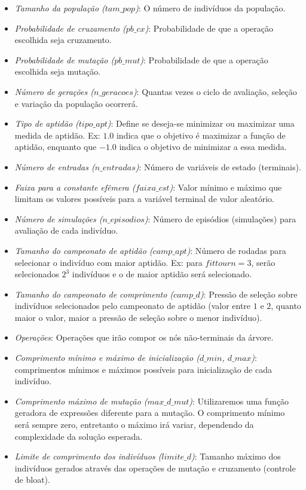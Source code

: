 \begin{itemize}[label=\raisebox{0.25ex}{\tiny$\bullet$}]
	\item \textit{Tamanho da população ($tam\_pop$)}: O número de indivíduos da população. 
	\item \textit{Probabilidade de cruzamento ($pb\_cx$)}: Probabilidade de que a operação escolhida seja cruzamento.
	\item \textit{Probabilidade de mutação ($pb\_mut$)}: Probabilidade de que a operação escolhida seja mutação.
	\item \textit{Número de gerações ($n\_geracoes$)}: Quantas vezes o ciclo de avaliação, seleção e variação da população ocorrerá.
	\item \textit{Tipo de aptidão ($tipo\_apt$)}: Define se deseja-se minimizar ou maximizar uma medida de aptidão. Ex: $1.0$ indica que o objetivo é maximizar a função de aptidão, enquanto que $-1.0$ indica o objetivo de minimizar a essa medida.
	\item \textit{Número de entradas ($n\_entradas$)}: Número de variáveis de estado (terminais).
	\item \textit{Faixa para a constante efêmera ($faixa\_cst$)}: Valor mínimo e máximo que limitam os valores possíveis para a variável terminal de valor aleatório.
	\item \textit{Número de simulações ($n\_episodios$)}: Número de episódios (simulações) para avaliação de cada indivíduo.
	\item \textit{Tamanho do campeonato de aptidão ($camp\_apt$)}: Número de rodadas para selecionar o indivíduo com maior aptidão. Ex: para $fittourn=3$, serão selecionados $2^{3}$ indivíduos e o de maior aptidão será selecionado.
	\item \textit{Tamanho do campeonato de comprimento ($camp\_d$)}: Pressão de seleção sobre indivíduos selecionados pelo campeonato de aptidão (valor entre $1$ e $2$, quanto maior o valor, maior a pressão de seleção sobre o menor indivíduo).
	\item \textit{Operações}: Operações que irão compor os nós não-terminais da árvore.
	\item \textit{Comprimento mínimo e máximo de inicialização ($d\_min$, $d\_max$)}: comprimentos mínimos e máximos possíveis para inicialização de cada indivíduo.
	\item \textit{Comprimento máximo de mutação ($max\_d\_mut$)}: Utilizaremos uma função geradora de expressões diferente para a mutação. O comprimento mínimo será sempre zero, entretanto o máximo irá variar, dependendo da complexidade da solução esperada.
	\item \textit{Limite de comprimento dos indivíduos ($limite\_d$)}: Tamanho máximo dos indivíduos gerados através das operações de mutação e cruzamento (controle de bloat).	
\end{itemize}

